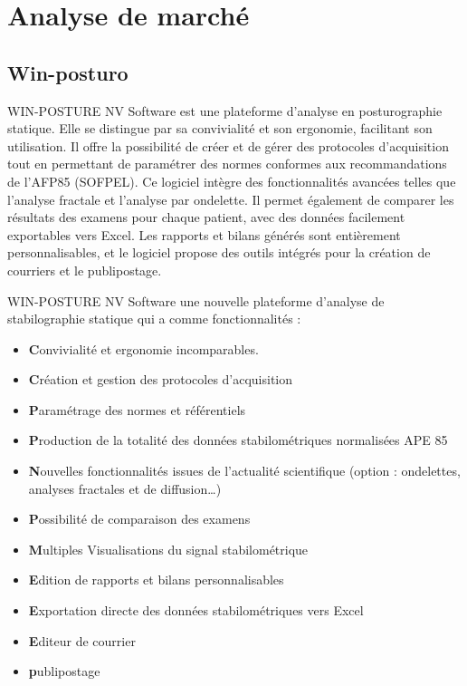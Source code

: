 \section{Analyse de marché}

\subsection{Win-posturo}


WIN-POSTURE NV Software est une plateforme d'analyse en posturographie statique. 
Elle se distingue par sa convivialité et son ergonomie, facilitant son utilisation. 
Il offre la possibilité de créer et de gérer des protocoles d'acquisition tout en permettant de paramétrer des normes conformes aux recommandations de l'AFP85 (SOFPEL). 
Ce logiciel intègre des fonctionnalités avancées telles que l'analyse fractale et l'analyse par ondelette. 
Il permet également de comparer les résultats des examens pour chaque patient, avec des données facilement exportables vers Excel. 
Les rapports et bilans générés sont entièrement personnalisables, et le logiciel propose des outils intégrés pour la création de courriers et le publipostage.


WIN-POSTURE NV Software une nouvelle plateforme d’analyse de stabilographie statique qui a comme fonctionnalités : 
\begin{itemize}
    \item \textbf Convivialité et ergonomie incomparables.
    \item \textbf Création et gestion des protocoles d’acquisition
    \item \textbf Paramétrage des normes et référentiels 
    \item \textbf Production de la totalité des données stabilométriques normalisées APE 85
    \item \textbf Nouvelles fonctionnalités issues de l’actualité scientifique (option : ondelettes, analyses fractales et de diffusion…) 
    \item \textbf Possibilité de comparaison des examens 
    \item \textbf Multiples Visualisations du signal stabilométrique 
    \item \textbf Edition de rapports et bilans personnalisables  
    \item \textbf Exportation directe des données stabilométriques vers Excel 
    \item \textbf Editeur de courrier 
    \item \textbf publipostage
\end{itemize}

